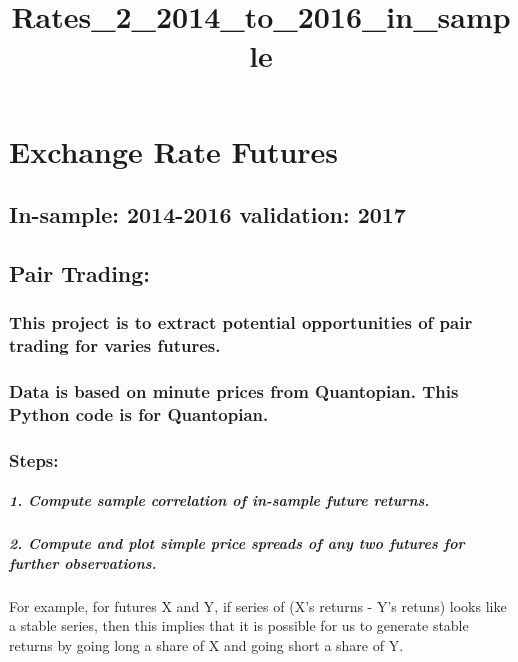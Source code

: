 \documentclass[11pt]{article}
\title{Rates\_2\_2014\_to\_2016\_in\_sample}
\begin{document}
    
    
    \maketitle
    
    

    
    \section{Exchange Rate Futures}\label{exchange-rate-futures}

\subsection{In-sample: 2014-2016 validation:
2017}\label{in-sample-2014-2016-validation-2017}

\subsection{Pair Trading:}\label{pair-trading}

\subsubsection{This project is to extract potential opportunities of
pair trading for varies
futures.}\label{this-project-is-to-extract-potential-opportunities-of-pair-trading-for-varies-futures.}

\subsubsection{Data is based on minute prices from Quantopian. This
Python code is for
Quantopian.}\label{data-is-based-on-minute-prices-from-quantopian.-this-python-code-is-for-quantopian.}

\subsubsection{Steps:}\label{steps}

\subparagraph{1. Compute sample correlation of in-sample future
returns.}\label{compute-sample-correlation-of-in-sample-future-returns.}

\subparagraph{2. Compute and plot simple price spreads of any two
futures for further
observations.}\label{compute-and-plot-simple-price-spreads-of-any-two-futures-for-further-observations.}

For example, for futures X and Y, if series of (X's returns - Y's
retuns) looks like a stable series, then this implies that it is
possible for us to generate stable returns by going long a share of X
and going short a share of Y.
\end{document}
